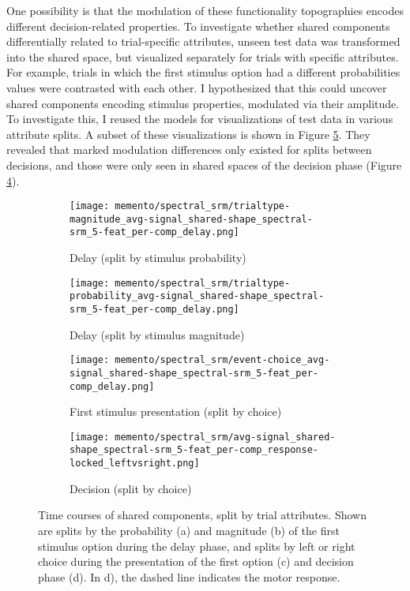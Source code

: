 One possibility is that the modulation of these functionality topographies encodes different decision-related properties.
To investigate whether shared components differentially related to trial-specific attributes, unseen test data was transformed into the shared space, but visualized separately for trials with specific attributes.
For example, trials in which the first stimulus option had a different probabilities values were contrasted with each other.
I hypothesized that this could uncover shared components encoding stimulus properties, modulated via their amplitude.
To investigate this, I reused the models for visualizations of test data in various attribute splits.
A subset of these visualizations is shown in Figure \ref{fig:spectral-comps-attributes}.
They revealed that marked modulation differences only existed for splits between decisions, and those were only seen in shared spaces of the decision phase (Figure \ref{fig:spectral-comp-decision-splitchoice}).

\begin{figure}
	\begin{subfigure}{0.49\textwidth}
	\texttt{[image: memento/spectral\_srm/trialtype-magnitude\_avg-signal\_shared-shape\_spectral-srm\_5-feat\_per-comp\_delay.png]}
	\caption{Delay (split by stimulus probability)}
	\label{fig:spectral-comp-delay-splitprob}
\end{subfigure}
	\begin{subfigure}{0.49\textwidth}
		\texttt{[image: memento/spectral\_srm/trialtype-probability\_avg-signal\_shared-shape\_spectral-srm\_5-feat\_per-comp\_delay.png]}
		\caption{Delay (split by stimulus magnitude)}
		\label{fig:spectral-comp-delay-splitmag}
	\end{subfigure}
\hfill
	\begin{subfigure}{0.49\textwidth}
		\texttt{[image: memento/spectral\_srm/event-choice\_avg-signal\_shared-shape\_spectral-srm\_5-feat\_per-comp\_delay.png]}
		\caption{First stimulus presentation (split by choice)}
		\label{fig:spectral-comp-delay-splitchoice}
	\end{subfigure}
	\begin{subfigure}{0.49\textwidth}
		\texttt{[image: memento/spectral\_srm/avg-signal\_shared-shape\_spectral-srm\_5-feat\_per-comp\_response-locked\_leftvsright.png]}
		\caption{Decision (split by choice)}
		\label{fig:spectral-comp-decision-splitchoice}
	\end{subfigure}
	\caption[Shared components split by trial attribute]{Time courses of shared components, split by trial attributes. Shown are splits by the probability (a) and magnitude (b) of the first stimulus option during the delay phase, and splits by left or right choice during the presentation of the first option (c) and decision phase (d). In d), the dashed line indicates the motor response.}
	\label{fig:spectral-comps-attributes}
\end{figure}

